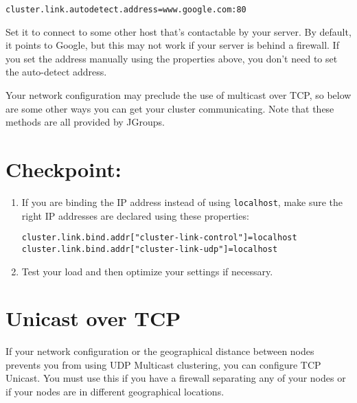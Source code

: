 \begin{verbatim}
cluster.link.autodetect.address=www.google.com:80
\end{verbatim}

Set it to connect to some other host that's contactable by your server.
By default, it points to Google, but this may not work if your server is
behind a firewall. If you set the address manually using the properties
above, you don't need to set the auto-detect address.

Your network configuration may preclude the use of multicast over TCP,
so below are some other ways you can get your cluster communicating.
Note that these methods are all provided by JGroups.

\section{Checkpoint:}\label{checkpoint}

\begin{enumerate}
\def\labelenumi{\arabic{enumi}.}
\item
  If you are binding the IP address instead of using \texttt{localhost},
  make sure the right IP addresses are declared using these properties:

\begin{verbatim}
cluster.link.bind.addr["cluster-link-control"]=localhost
cluster.link.bind.addr["cluster-link-udp"]=localhost
\end{verbatim}
\item
  Test your load and then optimize your settings if necessary.
\end{enumerate}

\section{Unicast over TCP}\label{unicast-over-tcp}

If your network configuration or the geographical distance between nodes
prevents you from using UDP Multicast clustering, you can configure TCP
Unicast. You must use this if you have a firewall separating any of your
nodes or if your nodes are in different geographical locations.

